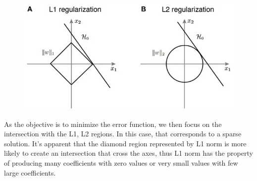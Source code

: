 \documentclass[11pt]{article}
\makeatletter
\def\maxwidth{\ifdim\Gin@nat@width>\linewidth\linewidth
    \else\Gin@nat@width\fi}
\let\Oldincludegraphics\includegraphics
\renewcommand{\includegraphics}[1]{\Oldincludegraphics[width=.8\maxwidth]{#1}}
\makeatother
\begin{document}
\begin{figure}[H]
\centering
\includegraphics{l1l2.png}
\caption{}
\end{figure}

As the objective is to minimize the error function,
we then focus on the intersection with the L1, L2
regions.  In this case, that corresponds to a sparse solution. It's apparent that the diamond region represented by L1 norm is
more likely to create an intersection that cross the axes, thus L1 norm has the property of producing many coefficients with zero values or very small values with few large coefficients. 


    
    
    
    
\end{document}
